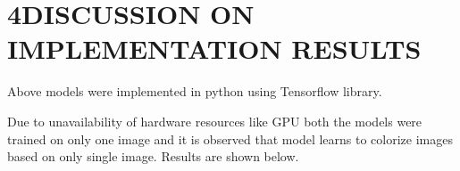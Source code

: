 \documentclass[12pt]{article}
\begin{document}
\vspace{\baselineskip}
\begin{Center}
\textbf{ }
\end{Center}\par

\begin{Center}
\textbf{ }
\end{Center}\par


\vspace{\baselineskip}
\section*{4\hspace*{10pt}DISCUSSION ON IMPLEMENTATION RESULTS}
\begin{justify}
Above models were implemented in python using Tensorflow library.
\end{justify}\par

\begin{justify}
Due to unavailability of hardware resources like GPU both the models were trained on only one image and it is observed that model learns to colorize images based on only single image. Results are shown below.
\end{justify}\par



\end{document}
